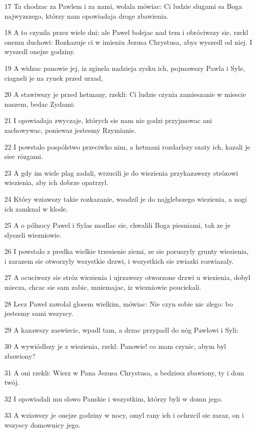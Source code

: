 \par 17 Ta chodzac za Pawlem i za nami, wolala mówiac: Ci ludzie slugami sa Boga najwyzszego, którzy nam opowiadaja droge zbawienia.
\par 18 A to czynila przez wiele dni; ale Pawel bolejac nad tem i obróciwszy sie, rzekl onemu duchowi: Rozkazuje ci w imieniu Jezusa Chrystusa, abys wyszedl od niej. I wyszedl onejze godziny.
\par 19 A widzac panowie jej, iz zginela nadzieja zysku ich, pojmawszy Pawla i Syle, ciagneli je na rynek przed urzad,
\par 20 A stawiwszy je przed hetmany, rzekli: Ci ludzie czynia zamieszanie w miescie naszem, bedac Zydami:
\par 21 I opowiadaja zwyczaje, których sie nam nie godzi przyjmowac ani zachowywac, poniewaz jestesmy Rzymianie.
\par 22 I powstalo pospólstwo przeciwko nim, a hetmani rozdarlszy szaty ich, kazali je siec rózgami.
\par 23 A gdy im wiele plag zadali, wrzucili je do wiezienia przykazawszy strózowi wiezienia, aby ich dobrze opatrzyl.
\par 24 Który wziawszy takie rozkazanie, wsadzil je do najglebszego wiezienia, a nogi ich zamknal w klode.
\par 25 A o pólnocy Pawel i Sylas modlac sie, chwalili Boga piesniami, tak ze je slyszeli wiezniowie.
\par 26 I powstalo z predka wielkie trzesienie ziemi, ze sie poruszyly grunty wiezienia, i zarazem sie otworzyly wszystkie drzwi, i wszystkich sie zwiazki rozwiazaly.
\par 27 A ocuciwszy sie stróz wiezienia i ujrzawszy otworzone drzwi u wiezienia, dobyl miecza, chcac sie sam zabic, mniemajac, iz wiezniowie pouciekali.
\par 28 Lecz Pawel zawolal glosem wielkim, mówiac: Nie czyn sobie nic zlego: bo jestesmy sami wszyscy.
\par 29 A kazawszy zaswiecic, wpadl tam, a drzac przypadl do nóg Pawlowi i Syli:
\par 30 A wywiódlszy je z wiezienia, rzekl: Panowie! co mam czynic, abym byl zbawiony?
\par 31 A oni rzekli: Wierz w Pana Jezusa Chrystusa, a bedziesz zbawiony, ty i dom twój.
\par 32 I opowiadali mu slowo Panskie i wszystkim, którzy byli w domu jego.
\par 33 A wziawszy je onejze godziny w nocy, omyl rany ich i ochrzcil sie zaraz, on i wszyscy domownicy jego.
